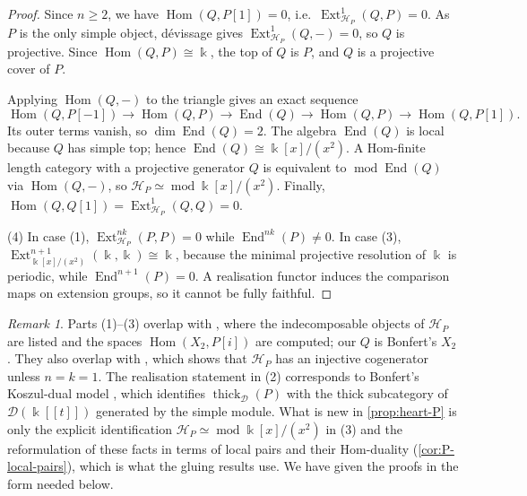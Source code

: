 \documentclass[11pt,reqno]{amsart}
\theoremstyle{plain}
\theoremstyle{definition}
\theoremstyle{remark}
\newtheorem{remark}[theorem]{Remark}
\newcommand{\kk}{\Bbbk}
\DeclareMathOperator{\Hom}{Hom}
\DeclareMathOperator{\End}{End}
\DeclareMathOperator{\Ext}{Ext}
\newcommand{\modd}{\operatorname{mod}}
\newcommand{\thick}[2][\cD]{\operatorname{thick}_{#1}(#2)}
\newcommand{\cD}{\mathcal{D}}
\newcommand{\cH}{\mathcal{H}}
\begin{document}
\begin{proof}
Since $n\ge2$, we have $\Hom(Q,P[1])=0$, i.e.\ $\Ext^1_{\cH_P}(Q,P)=0$. As $P$ is the only simple object, d\'evissage gives $\Ext^1_{\cH_P}(Q,-)=0$, so $Q$ is projective. Since $\Hom(Q,P)\cong\kk$, the top of $Q$ is $P$, and $Q$ is a projective cover of $P$.

Applying $\Hom(Q,-)$ to the triangle gives an exact sequence
\[\Hom(Q,P[-1])\to\Hom(Q,P)\to\End(Q)\to\Hom(Q,P)\to\Hom(Q,P[1]).\]
Its outer terms vanish, so $\dim\End(Q)=2$. The algebra $\End(Q)$ is local because $Q$ has simple top; hence $\End(Q)\cong\kk[x]/(x^2)$. A Hom-finite length category with a projective generator $Q$ is equivalent to $\modd\End(Q)$ via $\Hom(Q,-)$, so $\cH_P\simeq\modd\kk[x]/(x^2)$. Finally, $\Hom(Q,Q[1])=\Ext^1_{\cH_P}(Q,Q)=0$.

(4) In case (1), $\Ext^{nk}_{\cH_P}(P,P)=0$ while $\End^{nk}(P)\ne0$. In case (3), $\Ext^{n+1}_{\kk[x]/(x^2)}(\kk,\kk)\cong\kk$, because the minimal projective resolution of $\kk$ is periodic, while $\End^{n+1}(P)=0$. A realisation functor induces the comparison maps on extension groups, so it cannot be fully faithful.
\end{proof}

\begin{remark}
Parts (1)--(3) overlap with \cite[Lemma~3.11]{Bonf26}, where the indecomposable objects of $\cH_P$ are listed and the spaces $\Hom(X_2,P[i])$ are computed; our $Q$ is Bonfert's $X_2$. They also overlap with \cite[Lemma~4.15]{Bonf26}, which shows that $\cH_P$ has an injective cogenerator unless $n=k=1$. The realisation statement in (2) corresponds to Bonfert's Koszul-dual model \cite[Cor.~4.16(2)]{Bonf26}, which identifies $\thick P$ with the thick subcategory of $\mathcal{D}(\kk[[t]])$ generated by the simple module. What is new in \cref{prop:heart-P} is only the explicit identification $\cH_P\simeq\modd\kk[x]/(x^2)$ in (3) and the reformulation of these facts in terms of local pairs and their Hom-duality (\cref{cor:P-local-pairs}), which is what the gluing results use. We have given the proofs in the form needed below.
\end{remark}
\end{document}
